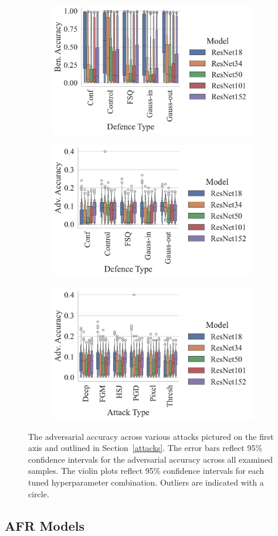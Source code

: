 \label{results}
\begin{figure}[!h]
\centering
\begin{subfigure}
    \centering
    \includegraphics[trim={7pt 10pt 20pt 0pt},clip,width=.40\textwidth]{plots/ben_accuracy_vs_defence_type.pdf}
\end{subfigure}
\begin{subfigure}
    \centering
    \includegraphics[trim={7pt 10pt 20pt 0pt},clip,width=.40\textwidth]{plots/adv_accuracy_vs_defence_type.pdf}
\end{subfigure}
\begin{subfigure}
    \centering
    \includegraphics[trim={7pt 10pt 20pt 0pt},clip,width=.40\textwidth]{plots/adv_accuracy_vs_attack_type.pdf}
\end{subfigure}
\caption{The adversarial accuracy across various attacks pictured on the first axis and outlined in Section~\ref{attacks}. The error bars reflect 95\% confidence intervals for the adversarial accuracy across all examined samples. The violin plots reflect 95\% confidence intervals for each tuned hyperparameter combination. Outliers are indicated with a circle.}
\label{fig:accuracies}
\end{figure}

\subsection{AFR Models}

